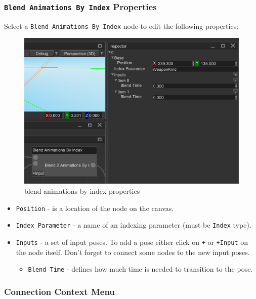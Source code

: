 \documentclass[
]{book}
\providecommand{\tightlist}{%
  \setlength{\itemsep}{0pt}\setlength{\parskip}{0pt}}
\theoremstyle{definition}
\theoremstyle{definition}
\theoremstyle{definition}
\theoremstyle{definition}
\theoremstyle{remark}
\begin{document}
\subsubsection{\texorpdfstring{\texttt{Blend\ Animations\ By\ Index} Properties}{Blend Animations By Index Properties}}\label{blend-animations-by-index-properties}

Select a \texttt{Blend\ Animations\ By\ Index} node to edit the following properties:

\begin{figure}
\centering
\includegraphics{images/animation/absm_blend_animations_by_index_properties.png}
\caption{blend animations by index properties}
\end{figure}

\begin{itemize}
\tightlist
\item
  \texttt{Position} - is a location of the node on the canvas.
\item
  \texttt{Index\ Parameter} - a name of an indexing parameter (must be \texttt{Index} type).
\item
  \texttt{Inputs} - a set of input poses. To add a pose either click on \texttt{+} or \texttt{+Input} on the node itself. Don't forget to
  connect some nodes to the new input poses.

  \begin{itemize}
  \tightlist
  \item
    \texttt{Blend\ Time} - defines how much time is needed to transition to the pose.
  \end{itemize}
\end{itemize}

\subsubsection{Connection Context Menu}\label{connection-context-menu}
\end{document}

